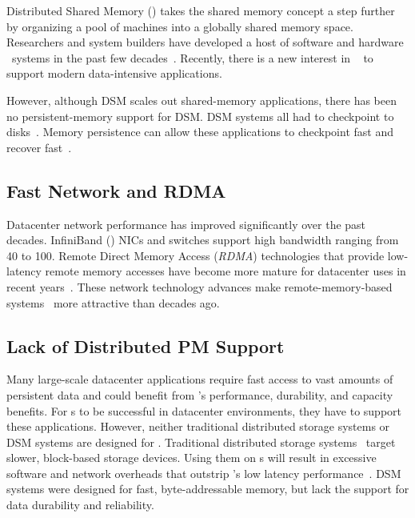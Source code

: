 Distributed Shared Memory ({\em \dsm}) takes the shared memory concept a step further 
by organizing a pool of machines into a globally shared memory space.
Researchers and system builders have developed a host of software and hardware \dsm\ systems in the past few 
decades~\cite{Bennett90-PPOPP,Bisiani90-ISCA,Black89-COMPCON,Delp:1988:AIM:59505,Fleisch89-SOSP,Gibbons91-SPAA,Kontothanassis97-ISCA,Lo94-AC,Kessler89-ACM,Keleher92-ISCA,Ramachandran91-Wiley,Zhou92-IEEE,Stumm90-IEEE,Stumm90-IPDPS,HLRC,Shasta}.
Recently, there is a new interest in \dsm~\cite{Nelson15-ATC} to support modern data-intensive applications.

However, although DSM scales out shared-memory applications, 
there has been no persistent-memory support for DSM.
DSM systems all had to checkpoint to disks~\cite{Stumm90,Richard93,Neves94}.
Memory persistence
can allow these applications to checkpoint fast and recover fast~\cite{Narayanan12-ASPLOS}.

\subsection{Fast Network and RDMA}
Datacenter network performance has improved significantly over the past decades.
InfiniBand ({\em \ib}) NICs and switches support high bandwidth ranging from 40 to 100\gbps.
Remote Direct Memory Access ({\em RDMA}) technologies that provide low-latency remote memory accesses
have become more mature for datacenter uses in recent years~\cite{FaSST,Dragojevic14-NSDI,Kalia14-SIGCOMM,Guo16-SIGCOMM}.
These network technology advances
make remote-memory-based systems~\cite{Nelson15-ATC,GU17-NSDI,OSDI-Disaggregate,Chen16-EUROSYS,Binnig16-VLDB,Zamanian17-VLDB} more attractive than decades ago.

\subsection{Lack of Distributed PM Support}

Many large-scale datacenter applications require fast access to vast amounts of persistent data
and could benefit from \nvm's performance, durability, and capacity benefits.
For \nvm{}s to be successful in datacenter environments, they have to support these applications.
However, neither traditional distributed storage systems or DSM systems are designed for \nvm.
Traditional distributed storage systems~\cite{AdyaEtAl-Farsite,calder11-azure,DeCandia+07-Dynamo,Ghemawat03-GoogleFS,KubiEtAl00-Ocean,Petersen97-Bayou}
target slower, block-based storage devices.
Using them on \nvm{}s will result in excessive software and network overheads that outstrip \nvm's low latency performance~\cite{Zhang15-Mojim}.
DSM systems were designed for fast, byte-addressable memory, but lack the support for data durability and reliability.

